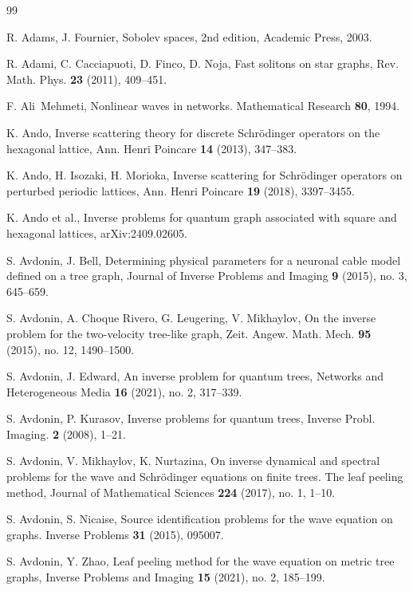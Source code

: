 \documentclass[11pt]{amsart}
\theoremstyle{definition}
\theoremstyle{plain}
\numberwithin{equation}{section}
\begin{document}
\bigskip
\begin{thebibliography}{99}

R. Adams, J. Fournier, Sobolev spaces, 2nd edition, Academic Press, 2003.

R. Adami, C. Cacciapuoti, D. Finco, D. Noja, Fast solitons on star graphs, Rev. Math. Phys. {\bf 23} (2011), 409--451.

F. Ali~Mehmeti, Nonlinear waves in networks.
\newblock Mathematical Research \textbf{80}, 1994.

K. Ando, Inverse scattering theory for discrete Schr{\"o}dinger operators on the hexagonal lattice, Ann. Henri Poincare {\bf 14} (2013), 347--383.


K. Ando, H. Isozaki, H. Morioka, Inverse scattering for Schrödinger operators on perturbed periodic lattices, Ann. Henri Poincare {\bf 19} (2018), 3397--3455.


K. Ando et al., Inverse problems for quantum graph associated with square and hexagonal lattices, arXiv:2409.02605.


 S. Avdonin, J. Bell, Determining physical parameters for a neuronal cable model defined on a tree graph, {Journal of Inverse Problems and Imaging} {\bf 9} (2015), no. 3, 645--659.


     {S. Avdonin, A. Choque Rivero, G. Leugering, V. Mikhaylov,} {
On the inverse problem for the two-velocity tree-like graph},
\newblock Zeit. Angew. Math. Mech. \textbf{95} (2015), no. 12, 1490--1500.

S. Avdonin, J. Edward, An inverse problem for quantum trees, Networks and Heterogeneous Media {\bf 16} (2021), no. 2, 317--339.

   S. Avdonin, P. Kurasov, {Inverse problems
for quantum trees,} 
\newblock Inverse Probl. Imaging. {\bf 2} (2008), 1--21.


  S. Avdonin, V. Mikhaylov, K. Nurtazina, On inverse dynamical and spectral problems
  for the wave and Schr\"odinger equations on finite trees. The leaf peeling method, { Journal of Mathematical Sciences} {\bf 224} (2017), no. 1, 1--10.

    
S. Avdonin, S. Nicaise, Source identification problems for the wave equation on graphs.
\newblock Inverse Problems \textbf{31} (2015), 095007.

   S. Avdonin, Y. Zhao, Leaf peeling method for the wave equation on metric tree graphs, {Inverse Problems and Imaging}  {\bf 15} (2021), no. 2, 185--199.


\end{thebibliography}
\end{document}
